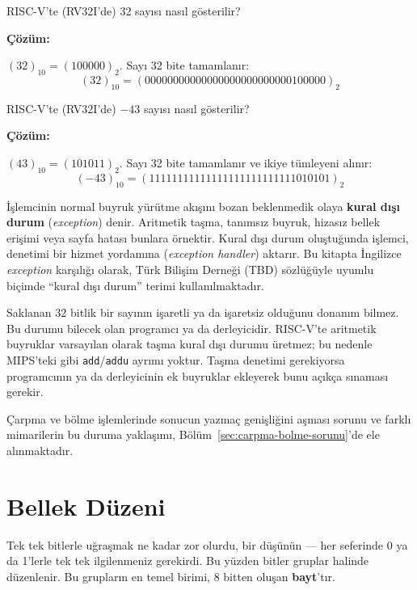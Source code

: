 \begin{ornek}[3.6]
RISC-V'te (RV32I'de) 32 sayısı nasıl gösterilir?

\textbf{Çözüm:}

$(32)_{10} = (100000)_2$. Sayı 32 bite tamamlanır:
\[
(32)_{10} = (00000000000000000000000000100000)_2
\]
\end{ornek}

\begin{ornek}[3.7]
RISC-V'te (RV32I'de) $-43$ sayısı nasıl gösterilir?

\textbf{Çözüm:}

$(43)_{10} = (101011)_2$. Sayı 32 bite tamamlanır ve ikiye tümleyeni alınır:
\[
(-43)_{10} = (11111111111111111111111111010101)_2
\]
\end{ornek}

\begin{tanim}
İşlemcinin normal buyruk yürütme akışını bozan beklenmedik olaya \textbf{kural dışı durum} (\emph{exception}) denir. Aritmetik taşma, tanımsız buyruk, hizasız bellek erişimi veya sayfa hatası bunlara örnektir. Kural dışı durum oluştuğunda işlemci, denetimi bir hizmet yordamına (\emph{exception handler}) aktarır. Bu kitapta İngilizce \emph{exception} karşılığı olarak, Türk Bilişim Derneği (TBD) sözlüğüyle uyumlu biçimde ``kural dışı durum'' terimi kullanılmaktadır.
\end{tanim}

Saklanan 32 bitlik bir sayının işaretli ya da işaretsiz olduğunu donanım bilmez. Bu durumu bilecek olan programcı ya da derleyicidir. RISC-V'te aritmetik buyruklar varsayılan olarak taşma kural dışı durumu üretmez; bu nedenle MIPS'teki gibi \texttt{add}/\texttt{addu} ayrımı yoktur. Taşma denetimi gerekiyorsa programcının ya da derleyicinin ek buyruklar ekleyerek bunu açıkça sınaması gerekir.

Çarpma ve bölme işlemlerinde sonucun yazmaç genişliğini aşması sorunu ve farklı mimarilerin bu duruma yaklaşımı, Bölüm~\ref{sec:carpma-bolme-sorunu}'de ele alınmaktadır.


\section{Bellek Düzeni}
\label{sec:bellek-duzeni}

Tek tek bitlerle uğraşmak ne kadar zor olurdu, bir düşünün --- her seferinde 0 ya da 1'lerle tek tek ilgilenmeniz gerekirdi. Bu yüzden bitler gruplar halinde düzenlenir. Bu grupların en temel birimi, 8 bitten oluşan \textbf{bayt}'tır.

